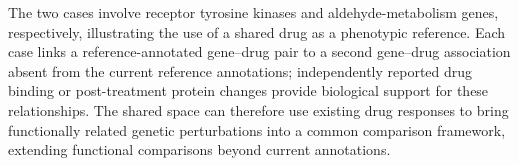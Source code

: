 The two cases involve receptor tyrosine kinases and aldehyde-metabolism genes, respectively, illustrating the use of a shared drug as a phenotypic reference. Each case links a reference-annotated gene--drug pair to a second gene--drug association absent from the current reference annotations; independently reported drug binding or post-treatment protein changes provide biological support for these relationships. The shared space can therefore use existing drug responses to bring functionally related genetic perturbations into a common comparison framework, extending functional comparisons beyond current annotations.
